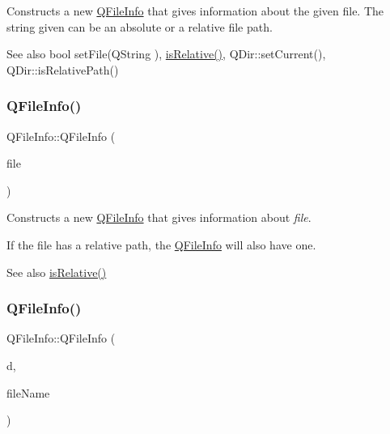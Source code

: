 Constructs a new \mbox{\hyperlink{class_q_file_info}{Q\+File\+Info}} that gives information about the given file. The string given can be an absolute or a relative file path.

\begin{DoxySeeAlso}{See also}
bool set\+File(\+Q\+String ), \mbox{\hyperlink{class_q_file_info_ae1b2d0ad6ca05510092d0182e276a5d0}{is\+Relative()}}, Q\+Dir\+::set\+Current(), Q\+Dir\+::is\+Relative\+Path() 
\end{DoxySeeAlso}
\mbox{\label{class_q_file_info_a33f5eaacd649938cf6a915817384c1f4}} 
\subsubsection{\texorpdfstring{QFileInfo()}{QFileInfo()}\hspace{0.1cm}{\footnotesize\ttfamily [3/5]}}
{\footnotesize\ttfamily Q\+File\+Info\+::\+Q\+File\+Info (\begin{DoxyParamCaption}\item[{const \mbox{\hyperlink{class_q_file}{Q\+File}} \&}]{file }\end{DoxyParamCaption})}

Constructs a new \mbox{\hyperlink{class_q_file_info}{Q\+File\+Info}} that gives information about {\itshape file}.

If the file has a relative path, the \mbox{\hyperlink{class_q_file_info}{Q\+File\+Info}} will also have one.

\begin{DoxySeeAlso}{See also}
\mbox{\hyperlink{class_q_file_info_ae1b2d0ad6ca05510092d0182e276a5d0}{is\+Relative()}} 
\end{DoxySeeAlso}
\mbox{\label{class_q_file_info_a6d57e31d5a4a8e6b6d405d2dd68641b5}} 
\subsubsection{\texorpdfstring{QFileInfo()}{QFileInfo()}\hspace{0.1cm}{\footnotesize\ttfamily [4/5]}}
{\footnotesize\ttfamily Q\+File\+Info\+::\+Q\+File\+Info (\begin{DoxyParamCaption}\item[{const \mbox{\hyperlink{class_q_dir}{Q\+Dir}} \&}]{d,  }\item[{const \mbox{\hyperlink{class_q_string}{Q\+String}} \&}]{file\+Name }\end{DoxyParamCaption})}

